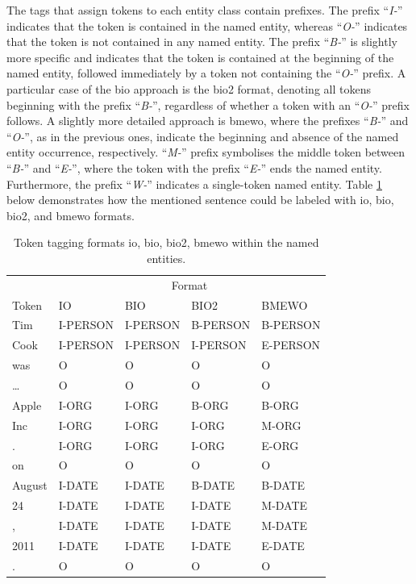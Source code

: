 The tags that assign tokens to each entity class contain prefixes. The prefix ``\textit{I-}'' indicates that the token is contained in the named entity, whereas ``\textit{O-}'' indicates that the token is not contained in any named entity. The prefix ``\textit{B-}'' is slightly more specific and indicates that the token is contained at the beginning of the named entity, followed immediately by a token not containing the ``\textit{O-}'' prefix. A particular case of the \acrshort{bio} approach is the \acrshort{bio}2 format, denoting all tokens beginning with the prefix ``\textit{B-}'', regardless of whether a token with an ``\textit{O-}'' prefix follows. A slightly more detailed approach is \acrshort{bmewo}, where the prefixes ``\textit{B-}'' and ``\textit{O-}'', as in the previous ones, indicate the beginning and absence of the named entity occurrence, respectively. ``\textit{M-}'' prefix symbolises the middle token between ``\textit{B-}'' and ``\textit{E-}'', where the token with the prefix ``\textit{E-}'' ends the named entity. Furthermore, the prefix ``\textit{W-}'' indicates a single-token named entity. Table \ref{table:ner-theoretical-example-tags} below demonstrates how the mentioned sentence could be labeled with \acrshort{io}, \acrshort{bio}, \acrshort{bio}2, and \acrshort{bmewo} formats.

\begin{table}[htbp]
    \centering
    \caption{Token tagging formats \acrshort{io}, \acrshort{bio}, \acrshort{bio}2, \acrshort{bmewo} within the named entities.}
    \label{table:ner-theoretical-example-tags}
    \begin{tabular}[t]{lllll}
        \hline
        &\multicolumn{4}{c}{Format}\\
        \cline{2-5}
 Token&IO&BIO&BIO2&BMEWO\\
        \hline
 Tim&I-PERSON&I-PERSON&B-PERSON&B-PERSON\\
 Cook&I-PERSON&I-PERSON&I-PERSON&E-PERSON\\
 was&O&O&O&O\\
        \dots&O&O&O&O\\
 Apple&I-ORG&I-ORG&B-ORG&B-ORG\\
 Inc&I-ORG&I-ORG&I-ORG&M-ORG\\
 .&I-ORG&I-ORG&I-ORG&E-ORG\\
 on&O&O&O&O\\
 August&I-DATE&I-DATE&B-DATE&B-DATE\\
 24&I-DATE&I-DATE&I-DATE&M-DATE\\
 ,&I-DATE&I-DATE&I-DATE&M-DATE\\
 2011&I-DATE&I-DATE&I-DATE&E-DATE\\
 .&O&O&O&O\\
        \hline
    \end{tabular}
\end{table}

